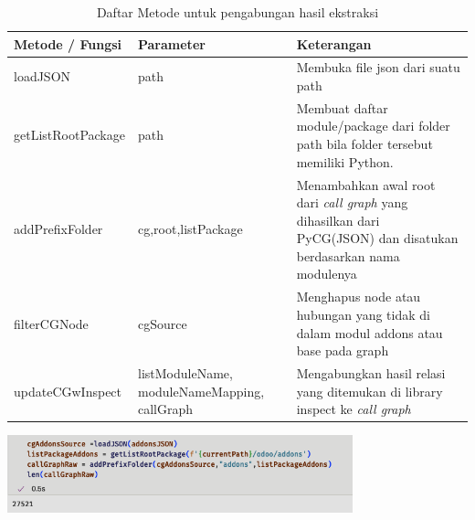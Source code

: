 \begingroup
\setlength{\LTleft}{-20cm plus -1fill}
\setlength{\LTright}{\LTleft}
\begin{small}
	\begin{longtable}{|p{4cm}|p{3cm}|p{6cm}|}
		\caption{Daftar Metode untuk pengabungan hasil ekstraksi}\\
		\hline
		\textbf{Metode / Fungsi} & \textbf{Parameter} & \textbf{Keterangan}\\
		\endfirsthead
		
		\hline  

		loadJSON
		& path
		 & Membuka file json dari suatu path  \\

		 \hline  

		 getListRootPackage
		& path
		 & Membuat daftar module/package dari folder path bila folder tersebut memiliki Python. \\

		 \hline  

		 addPrefixFolder
		& cg,root,listPackage
		 & Menambahkan awal root dari \textit{call graph} yang dihasilkan dari PyCG(JSON) dan disatukan berdasarkan nama modulenya  \\
		 
		 \hline  




		 filterCGNode
		& cgSource
		 & Menghapus node atau hubungan yang tidak di dalam modul addons atau base pada graph \\

		 \hline
		
		 updateCGwInspect
		& listModuleName, moduleNameMapping, callGraph
		 & Mengabungkan hasil relasi yang ditemukan di library inspect ke \textit{call graph}  \\

		 \hline
	\end{longtable}
\end{small}
\endgroup

\begin{center}
	\includegraphics[width=10cm]{img/bab_4/ekstraksi_1.png}
	\label{fig:ekstraksi_1}
\end{center}

